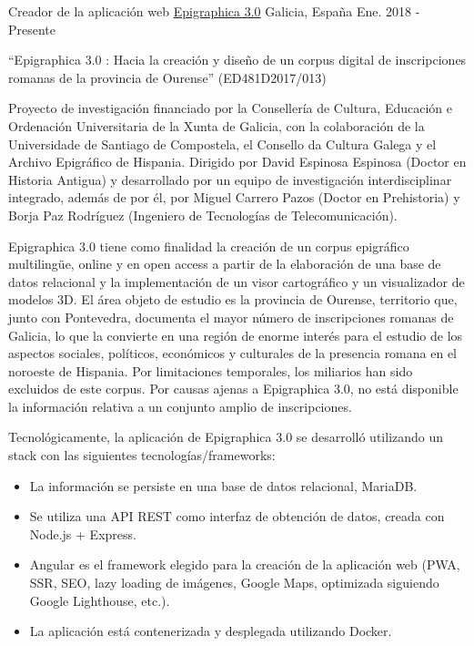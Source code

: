 \begin{cventries}
    \cventry
    {Creador de la aplicación web}
    {\href{https://epigraphica30.com}{Epigraphica 3.0}}
    {Galicia, España}
    {Ene. 2018 - Presente}
    {
      \begin{cvitems}
        \item {“Epigraphica 3.0 : Hacia la creación y diseño de un corpus digital de inscripciones romanas de la provincia de Ourense” (ED481D2017/013)}
        \item {Proyecto de investigación financiado por la Consellería de Cultura, Educación e Ordenación Universitaria de la Xunta de Galicia, con la colaboración de la Universidade de Santiago de Compostela, el Consello da Cultura Galega y el Archivo Epigráfico de Hispania. Dirigido por David Espinosa Espinosa (Doctor en Historia Antigua) y desarrollado por un equipo de investigación interdisciplinar integrado, además de por él, por Miguel Carrero Pazos (Doctor en Prehistoria) y Borja Paz Rodríguez (Ingeniero de Tecnologías de Telecomunicación).}
        \item {Epigraphica 3.0 tiene como finalidad la creación de un corpus epigráfico multilingüe, online y en open access a partir de la elaboración de una base de datos relacional y la implementación de un visor cartográfico y un visualizador de modelos 3D. El área objeto de estudio es la provincia de Ourense, territorio que, junto con Pontevedra, documenta el mayor número de inscripciones romanas de Galicia, lo que la convierte en una región de enorme interés para el estudio de los aspectos sociales, políticos, económicos y culturales de la presencia romana en el noroeste de Hispania. Por limitaciones temporales, los miliarios han sido excluidos de este corpus. Por causas ajenas a Epigraphica 3.0, no está disponible la información relativa a un conjunto amplio de inscripciones.}
        \item {Tecnológicamente, la aplicación de Epigraphica 3.0 se desarrolló utilizando un stack con las siguientes tecnologías/frameworks:}
          \begin{itemize}[label={---}]
            \item {La información se persiste en una base de datos relacional, MariaDB.}
            \item {Se utiliza una API REST como interfaz de obtención de datos, creada con Node.js + Express.}
            \item {Angular es el framework elegido para la creación de la aplicación web (PWA, SSR, SEO, lazy loading de imágenes, Google Maps, optimizada siguiendo Google Lighthouse, etc.).}
            \item {La aplicación está contenerizada y desplegada utilizando Docker.}
          \end{itemize}
      \end{cvitems}
    }


\end{cventries}

